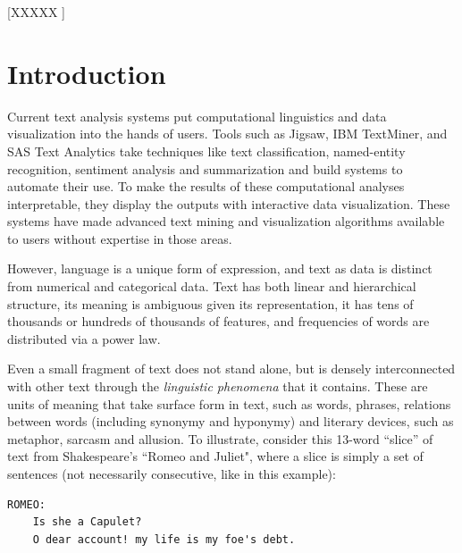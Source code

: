 \documentclass{sig-alternate}
\begin{document}

[XXXXX ]


\section{Introduction}
Current text analysis systems put computational linguistics and data visualization into the hands of users. Tools such as Jigsaw, IBM TextMiner, and SAS Text Analytics take techniques like text classification, named-entity recognition, sentiment analysis and summarization and build systems to automate their use. To make the results of these computational analyses interpretable, they display the outputs with interactive data visualization. These systems have made advanced text mining and visualization algorithms available to users without expertise in those areas.

However, language is a unique form of expression, and text as data is distinct from numerical and categorical data.  Text has both linear and hierarchical structure, its meaning is ambiguous given its representation, it has tens of thousands or hundreds of thousands of features, and frequencies of words are distributed via a power law.  

 Even a small fragment of text does not stand alone, but is densely interconnected with other text through the \emph{linguistic phenomena} that it contains. These are units of meaning that take surface form in text, such as words, phrases, relations between words (including synonymy and hyponymy) and literary devices, such as metaphor, sarcasm and allusion. To illustrate, consider this 13-word ``slice'' of text from Shakespeare's ``Romeo and Juliet", where a slice is simply a set of sentences (not necessarily consecutive, like in this example):

\begin{verbatim}
ROMEO:
    Is she a Capulet?
    O dear account! my life is my foe's debt.
\end{verbatim}
\end{document}

